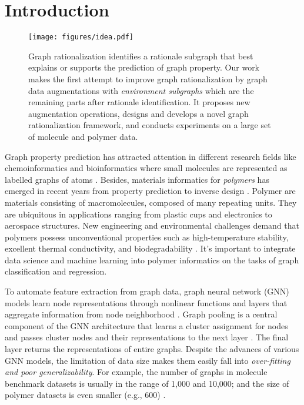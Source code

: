 \documentclass[sigconf]{acmart}
\begin{document}

\maketitle

\section{Introduction}
\label{sec:introduction}
\begin{figure*}[t]
    \centering
    \texttt{[image: figures/idea.pdf]}
    \vspace{-0.2in}
    \caption{Graph rationalization identifies a rationale subgraph that best explains or supports the prediction of graph property. Our work makes the first attempt to improve graph rationalization by graph data augmentations with \emph{environment subgraphs} which are the remaining parts after rationale identification. It proposes new augmentation operations, designs and develops a novel graph rationalization framework, and conducts experiments on a large set of molecule and polymer data.}
    \label{fig:idea}
    \vspace{-0.1in}
\end{figure*}

Graph property prediction has attracted attention in different research fields like chemoinformatics and bioinformatics where small molecules are represented as labelled graphs of atoms \cite{hu2020open,zhou2020data,guo2021few}.
Besides, materials informatics for \emph{polymers} has emerged in recent years from property prediction to inverse design \cite{kim2018polymer,chen2021polymer}.
Polymer are materials consisting of macromolecules, composed of many repeating units. They are ubiquitous in applications ranging from plastic cups and electronics to aerospace structures.
New engineering and environmental challenges demand that polymers possess unconventional properties such as high-temperature stability, excellent thermal conductivity, and biodegradability \cite{ma2019evaluating,wei2021thermal}.
It's important to integrate data science and machine learning into polymer informatics on the tasks of graph classification and regression.

To automate feature extraction from graph data, graph neural network (GNN) models learn node representations through nonlinear functions and layers that aggregate information from node neighborhood \cite{kipf2017semi,velivckovic2018graph,hamilton2017inductive,zhang2020deep,wu2020comprehensive}. Graph pooling is a central component of the GNN architecture that learns a cluster assignment for nodes and passes cluster nodes and their representations to the next layer \cite{ying2018hierarchical,lee2019self}. The final layer returns the representations of entire graphs. Despite the advances of various GNN models, the limitation of data size makes them easily fall into \emph{over-fitting and poor generalizability}. For example, the number of graphs in molecule benchmark datasets is usually in the range of 1,000 and 10,000; and the size of polymer datasets is even smaller (e.g., 600) \cite{ma2020pi1m}.
\end{document}
